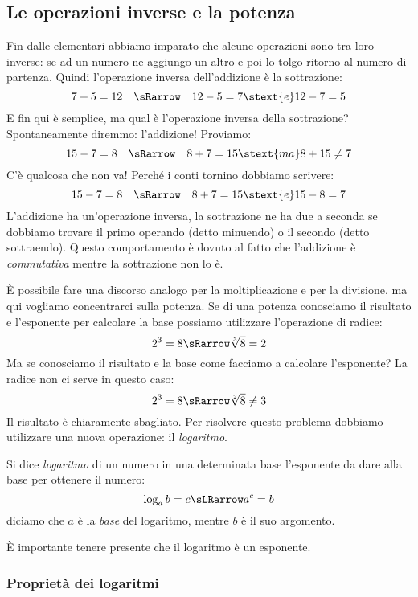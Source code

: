 \subsection{Le operazioni inverse e la potenza}
\label{subsec:esplog_operazioni_inverse}

Fin dalle elementari abbiamo imparato che alcune operazioni sono tra loro 
inverse: se ad un numero ne aggiungo un altro e poi lo tolgo ritorno al 
numero 
di partenza. Quindi l'operazione inversa dell'addizione è la sottrazione:
\[7 + 5 = 12 \quad \sRarrow \quad 12 - 5 = 7 \stext{ e } 12 - 7 = 5\]
E fin qui è semplice, ma qual è l'operazione inversa della sottrazione?
Spontaneamente diremmo: l'addizione! Proviamo:
\[15 - 7 = 8 \quad \sRarrow \quad 8 + 7 = 15 \stext{ ma } 8 + 15 \neq 7\]
C'è qualcosa che non va! Perché i conti tornino dobbiamo scrivere:
\[15 - 7 = 8 \quad \sRarrow \quad 8 + 7 = 15 \stext{ e } 15 - 8 = 7\]
L'addizione ha un'operazione inversa, la sottrazione 
ne ha due a seconda se dobbiamo trovare il primo operando (detto minuendo) 
o il 
secondo (detto sottraendo). Questo comportamento è dovuto al fatto che 
l'addizione è \emph{commutativa} mentre la sottrazione non lo è.

È possibile fare una discorso analogo per la moltiplicazione e per la 
divisione, ma qui vogliamo concentrarci sulla potenza. Se di una potenza 
conosciamo il risultato e l'esponente per calcolare la base possiamo 
utilizzare l'operazione di radice:
\[2^3 = 8 \sRarrow \sqrt[3]{8} = 2 \]
Ma se conosciamo il risultato e la base come facciamo a calcolare 
l'esponente?
La radice non ci serve in questo caso:
\[2^3 = 8 \sRarrow \sqrt[2]{8} \neq 3 \]
Il risultato è chiaramente sbagliato. Per risolvere questo problema 
dobbiamo utilizzare una nuova operazione: il \emph{logaritmo}.

\begin{definizione}[Logaritmo]
 Si dice \emph{logaritmo} di un numero in una determinata base l'esponente 
da 
dare alla base per ottenere il numero:
\[\log_a {b} = c \sLRarrow a^c = b\]
diciamo che \(a\) è la \emph{base} del logaritmo, mentre \(b\) è il suo 
argomento.
\end{definizione}

È importante tenere presente che il logaritmo è un esponente. 

\subsubsection{Proprietà dei logaritmi}
\label{subsubsec:esplog_proprieta_logaritmi}

